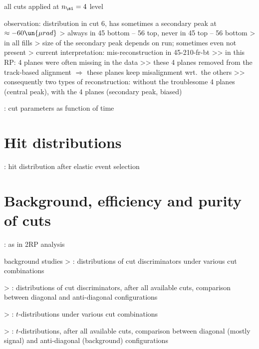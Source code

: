 \> all cuts applied at $n_\si = 4$ level

\> observation: distribution in cut 6, has sometimes a secondary peak at $\approx - 60\un{\mu rad}$
\>> always in 45 bottom -- 56 top, never in 45 top -- 56 bottom
\>> in all fills
\>> size of the secondary peak depends on run; sometimes even not present
\>> current interpretation: mis-reconstruction in 45-210-fr-bt
\>>> in this RP: 4 planes were often missing in the data
\>>> these 4 planes removed from the track-based alignment $\Rightarrow$ these planes keep misalignment wrt.~the others
\>>> consequently two types of reconstruction: without the troublesome 4 planes (central peak), with the 4 planes (secondary peak, biased)

\>  : cut parameters as function of time




\section{Hit distributions}

\> : hit distribution after elastic event selection



\section{Background, efficiency and purity of cuts}

\TODO: as in 2RP analysis


\> background studies
\>> : distributions of cut discriminators under various cut combinations

\>> : distributions of cut discriminators, after all available cuts, comparison between diagonal and anti-diagonal configurations

\>> : $t$-distributions under various cut combinations

\>> : $t$-distributions, after all available cuts, comparison between diagonal (mostly signal) and anti-diagonal (background) configurations


